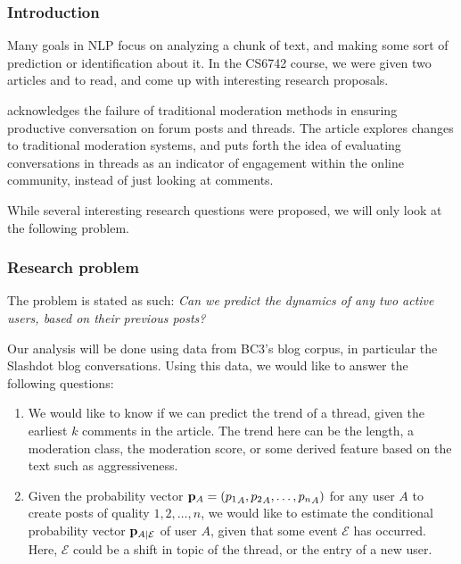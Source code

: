 \documentclass[a4paper,12pt]{article}
\numberwithin{equation}{section}
\begin{document}
 

\subsubsection*{Introduction}

% 


Many goals in NLP focus on analyzing a chunk of text, and making some sort of prediction or identification about it. In the CS6742 course, we were given two articles \cite{dejareview} and \cite{anae} to read, and come up with interesting research proposals. 

\cite{anae} acknowledges the failure of traditional moderation methods in ensuring productive conversation on forum posts and threads. The article explores changes to traditional moderation systems, and puts forth the idea of evaluating conversations in threads as an indicator of engagement within the online community, instead of just looking at comments.

While several interesting research questions were proposed, we will only look at the following problem.

\subsubsection*{Research problem}

The problem is stated as such: {\it Can we predict the dynamics of any two active users, based on their previous posts?}

Our analysis will be done using data from BC3's blog corpus, in particular the Slashdot blog conversations. Using this data, we would like to answer the following questions:
\vspace*{-0.5cm}
\begin{enumerate}
\item We would like to know if we can predict the trend of a thread, given the earliest $k$ comments in the article. The trend here can be the length, a moderation class, the moderation score, or some derived feature based on the text such as aggressiveness. 
\item Given the probability vector ${\bf p}_A = ({p_1}_A, {p_2}_A,\hdots, {p_n}_A)$ for any user $A$ to create posts of quality $1,2,\hdots, n$, we would like to estimate the conditional probability vector ${\bf p}_{A|\mathcal E}$ of user $A$, given that some event $\mathcal E$ has occurred. Here, $\mathcal E$ could be a shift in topic of the thread, or the entry of a new user.
\end{enumerate}
\end{document}
